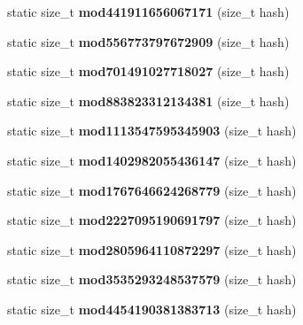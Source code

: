 \begin{DoxyCompactItemize}
\item 
static size\+\_\+t {\bfseries mod441911656067171} (size\+\_\+t hash)\label{structska_1_1prime__number__hash__policy_a8c58fed5c96653fc0d44fdc4c8608f6b}

\item 
static size\+\_\+t {\bfseries mod556773797672909} (size\+\_\+t hash)\label{structska_1_1prime__number__hash__policy_ae7a7159cc3a3d5de3d896d6d72748537}

\item 
static size\+\_\+t {\bfseries mod701491027718027} (size\+\_\+t hash)\label{structska_1_1prime__number__hash__policy_afde91e3311a3d10d485842aeccfae7b6}

\item 
static size\+\_\+t {\bfseries mod883823312134381} (size\+\_\+t hash)\label{structska_1_1prime__number__hash__policy_a7b21fa1d003f8481ad39877b1e969db0}

\item 
static size\+\_\+t {\bfseries mod1113547595345903} (size\+\_\+t hash)\label{structska_1_1prime__number__hash__policy_a8fbc68a50635ec541b02de99768a8c73}

\item 
static size\+\_\+t {\bfseries mod1402982055436147} (size\+\_\+t hash)\label{structska_1_1prime__number__hash__policy_aede3f70e62e8713ecc7fb8b3b20a86bc}

\item 
static size\+\_\+t {\bfseries mod1767646624268779} (size\+\_\+t hash)\label{structska_1_1prime__number__hash__policy_ab8f9496a378c3ad33148a074d3d024b5}

\item 
static size\+\_\+t {\bfseries mod2227095190691797} (size\+\_\+t hash)\label{structska_1_1prime__number__hash__policy_a724fa57eb05e33747c7c603eff619b5d}

\item 
static size\+\_\+t {\bfseries mod2805964110872297} (size\+\_\+t hash)\label{structska_1_1prime__number__hash__policy_a0d055ce889eae8427b94e6b1d0606dc9}

\item 
static size\+\_\+t {\bfseries mod3535293248537579} (size\+\_\+t hash)\label{structska_1_1prime__number__hash__policy_a23cc1f29405a176a0fde281501757496}

\item 
static size\+\_\+t {\bfseries mod4454190381383713} (size\+\_\+t hash)\label{structska_1_1prime__number__hash__policy_a9f0f00d240cde043c1797a91c51f08a3}


\end{DoxyCompactItemize}
